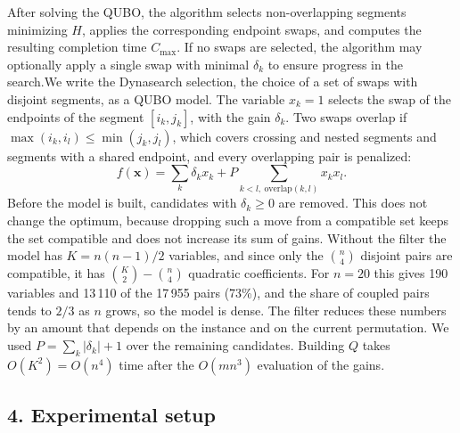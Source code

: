 \documentclass[12pt]{article}
\begin{document}
{After solving the QUBO, the algorithm selects non-overlapping segments minimizing $H$, applies the corresponding endpoint swaps, and computes the resulting completion time $C_{\max}$. If no swaps are selected, the algorithm may optionally apply a single swap with minimal $\delta_k$ to ensure progress in the search.}{We write the Dynasearch selection, the choice of a set of swaps with disjoint segments, as a QUBO model. The variable $x_k=1$ selects the swap of the endpoints of the segment $[i_k,j_k]$, with the gain $\delta_k$. Two swaps overlap if $\max(i_k,i_l)\le\min(j_k,j_l)$, which covers crossing and nested segments and segments with a shared endpoint, and every overlapping pair is penalized:
\begin{equation}
f(\mathbf{x})=\sum_k\delta_kx_k+P\sum_{k<l,\ \mathrm{overlap}(k,l)}x_kx_l.
\end{equation}
Before the model is built, candidates with $\delta_k\ge 0$ are removed. This does not change the optimum, because dropping such a move from a compatible set keeps the set compatible and does not increase its sum of gains. Without the filter the model has $K=n(n-1)/2$ variables, and since only the $\binom{n}{4}$ disjoint pairs are compatible, it has $\binom{K}{2}-\binom{n}{4}$ quadratic coefficients. For $n=20$ this gives 190 variables and 13\,110 of the 17\,955 pairs (73\%), and the share of coupled pairs tends to $2/3$ as $n$ grows, so the model is dense. The filter reduces these numbers by an amount that depends on the instance and on the current permutation. We used $P=\sum_k|\delta_k|+1$ over the remaining candidates. Building $Q$ takes $O(K^2)=O(n^4)$ time after the $O(mn^3)$ evaluation of the gains.}

\subsection*{4. Experimental setup}
\end{document}

